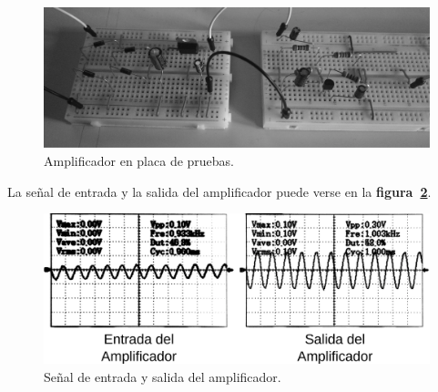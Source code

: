 \begin{figure}[!h]
\centering
\includegraphics[scale=0.10]{diagramas/figura21.eps}
\caption{Amplificador en placa de pruebas.}
\label{figura21}
\end{figure}

La señal de entrada y la salida del amplificador puede verse en la
\textbf{figura~\ref{figura22}}.

\begin{figure}[!h]
\centering
\includegraphics[scale=0.10]{diagramas/figura22.eps}
\caption{Señal de entrada y salida del amplificador.}
\label{figura22}
\end{figure}

